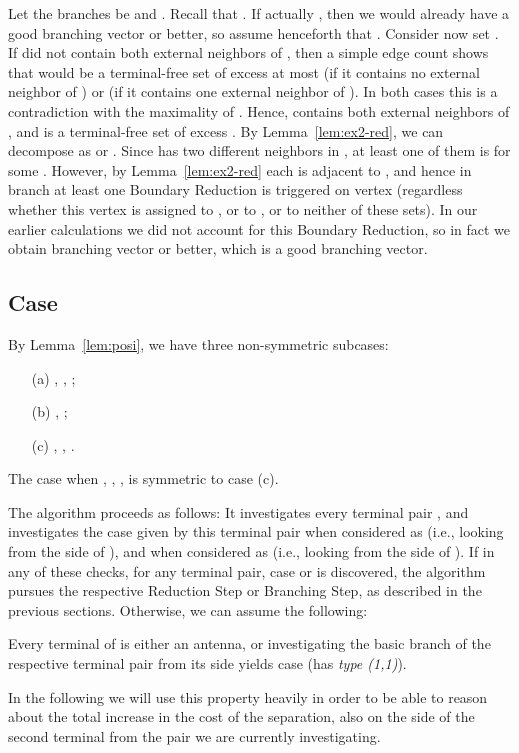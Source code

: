 Let the branches be  and . Recall that . If actually , then we would already have a good branching vector  or better, so assume henceforth that . Consider now set . If  did not contain both external neighbors of , then a simple edge count shows that  would be a terminal-free set of excess at most  (if it contains no external neighbor of ) or  (if it contains one external neighbor of ). In both cases this is a contradiction with the maximality of . Hence,  contains both external neighbors of , and  is a terminal-free set of excess . By Lemma~\ref{lem:ex2-red}, we can decompose  as  or . Since  has two different neighbors in , at least one of them is  for some . However, by Lemma~\ref{lem:ex2-red} each  is adjacent to , and hence in branch  at least one Boundary Reduction is triggered on vertex  (regardless whether this vertex is assigned to , or to , or to neither of these sets). In our earlier calculations we did not account for this Boundary Reduction, so in fact we obtain branching vector  or better, which is a good branching vector.











\subsection{Case }

By Lemma~\ref{lem:posi}, we have three non-symmetric subcases:
\begin{itemize}
\item[(a)] , , ;
\item[(b)] , ;
\item[(c)] , , .
\end{itemize}
The case when , , , is symmetric to case (c).

The algorithm proceeds as follows: It investigates every terminal pair , and investigates the case given by this terminal pair when considered as  (i.e., looking from the side of ), and when considered as  (i.e., looking from the side of ). If in any of these checks, for any terminal pair, case  or  is discovered, the algorithm pursues the respective Reduction Step or Branching Step, as described in the previous sections. Otherwise, we can assume the following:
\begin{assumption}\label{ass:cases-left}
Every terminal of  is either an antenna, or investigating the basic branch of the respective terminal pair from its side yields case  (has {\em{type (1,1)}}).
\end{assumption}
In the following we will use this property heavily in order to be able to reason about the total increase in the cost of the separation, also on the side of the second terminal from the pair we are currently investigating. 


